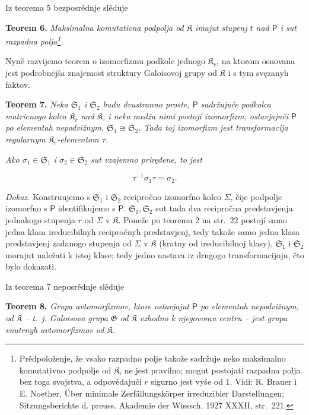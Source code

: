 \documentclass[11pt]{article}
\newcommand{\srcfn}[2]{\footnote{#2}}
\begin{document}
Iz teorema 5 bezposrědnje slěduje

\textbf{Teorem 6.} \emph{Maksimalna komutativna podpolja od \(\mathfrak K\) imajut stupenj \(t\) nad \(\mathsf P\) i sut razpadna polja\srcfn{1}{Prědpoloženje, že vsako razpadno polje takože sadržuje neko maksimalno komutativno podpolje od \(\mathfrak K\), ne jest pravilno; mogut postojati razpadna polja bez toga svojstva, a odpovědajuči \(r\) sigurno jest vyše od 1. Vidi: R. Brauer i E. Noether, Über minimale Zerfällungskörper irreduzibler Darstellungen; Sitzungsberichte d. preuss. Akademie der Wisssch. 1927 XXXII, str.~221.}.}

Nyně razvijemo teorem o izomorfizmu podkolc jednogo \(\mathfrak K_r\), na ktorom osnovana jest podrobnėjša znajemost struktury Galoisovoj grupy od \(\mathfrak K\) i s tym svęzanyh faktov.

\textbf{Teorem 7.} \emph{Neka \(\mathfrak S_1\) i \(\mathfrak S_2\) budu dvustranno proste, \(\mathsf P\) sadržujuće podkolca matricnogo kolca \(\mathfrak K_r\) nad \(\mathfrak K\), i neka medžu nimi postojí izomorfizm, ostavjajuči \(\mathsf P\) po elementah nepodvižnym, \(\mathfrak S_1\cong\mathfrak S_2\). Tada toj izomorfizm jest transformacija regularnym \(\mathfrak K_r\)-elementom \(\tau\).}

\emph{Ako \(\sigma_1\in\mathfrak S_1\) i \(\sigma_2\in\mathfrak S_2\) sut vzajemno priręđene, to jest}

\[
\tau^{-1}\sigma_1\tau=\sigma_2.
\]

\emph{Dokaz.} Konstruujemo s \(\mathfrak S_1\) i \(\mathfrak S_2\) recipročno izomorfno kolco \(\Sigma\), čije podpolje izomorfno s \(\mathsf P\) identifikujemo s \(\mathsf P\). \(\mathfrak S_1,\mathfrak S_2\) sut tada dva recipročna predstavjenja jednakogo stupenja \(r\) od \(\Sigma\) v \(\mathfrak K\). Poneže po teoremu 2 na str.~22 postojí samo jedna klasa ireducibilnyh recipročnyh predstavjenj, tedy takože samo jedna klasa predstavjenj zadanogo stupenja od \(\Sigma\) v \(\mathfrak K\) (kratny od ireducibilnoj klasy), \(\mathfrak S_1\) i \(\mathfrak S_2\) morajut naležati k istoj klase; tedy jedno nastava iz drugogo transformacijoju, čto bylo dokazati.

Iz teorema 7 neposrědnje slěduje

\textbf{Teorem 8.} \emph{Grupa avtomorfizmov, ktore ostavjajut \(\mathsf P\) po elementah nepodvižnym, od \(\mathfrak K\) -- t.~j. Galoisova grupa \(\mathfrak G\) od \(\mathfrak K\) vzhodno k njegovomu centru -- jest grupa vnutrnyh avtomorfizmov od \(\mathfrak K\).}
\end{document}
